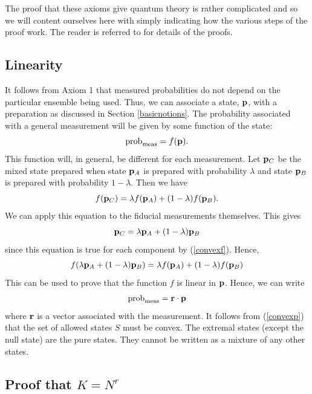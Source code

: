 \documentclass[10pt]{article}
\begin{document}
The proof that these axioms give quantum theory is rather complicated
and so we will content ourselves here with simply indicating how the
various steps of the proof work. The reader is referred to \cite{Hardy1}
for details of the proofs.

\subsection{Linearity}

It follows from Axiom 1 that measured probabilities do not depend on the
particular ensemble being used. Thus, we can associate a state, ${\bf
p}$, with a
preparation as discussed in Section \ref{basicnotions}.
The probability associated
with a general measurement will be given by some function of the state:
\begin{equation}
{\rm prob}_{\rm meas} = f({\bf p}).
\end{equation}
This function will, in general, be different for each measurement.
Let ${\bf p}_C$ be the mixed state prepared when state ${\bf p}_A$ is
prepared with probability $\lambda$ and state ${\bf p}_B$ is prepared
with probability $1-\lambda$.  Then we have
\begin{equation}\label{convexf}
f({\bf p}_C) = \lambda f({\bf p}_A)
+(1-\lambda) f({\bf p}_B).
\end{equation}
We can apply this equation to the fiducial measurements
themselves. This gives
\begin{equation}\label{convexp}
{\bf p}_C = \lambda {\bf p}_A+(1-\lambda){\bf p}_B
\end{equation}
since this equation is true for each component by (\ref{convexf}).
Hence,
\begin{equation}\label{convexpf}
f(\lambda {\bf p}_A+(1-\lambda){\bf p}_B)
= \lambda f({\bf p}_A)+(1-\lambda) f({\bf p}_B)
\end{equation}
This can be used to prove that the function $f$ is linear in ${\bf p}$.
Hence, we can write
\begin{equation}
{\rm prob}_{\rm meas}= {\bf r}\cdot {\bf p}
\end{equation}
where ${\bf r}$ is a vector associated with the measurement.
It follows from (\ref{convexp}) that the set of allowed states $S$ must
be convex.  The extremal states (except the null state) are the pure
states.  They cannot be written as a mixture of any other states.

\subsection{Proof that $K=N^r$}
\end{document}
